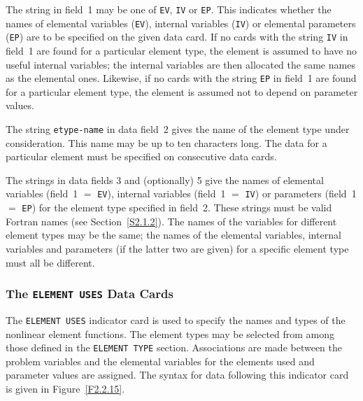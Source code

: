 \documentclass[a4paper]{article}
\begin{document}
The string in field~1  may be  one of {\tt  EV}, {\tt IV} or {\tt EP}.
This indicates whether the  names of  elemental variables
({\tt EV}), internal variables
({\tt IV})  or elemental parameters
({\tt EP}) are to be specified on the given data card.
If no  cards with the string
{\tt  IV}  in field~1   are found for  a particular  element type, the
element is assumed to have no useful internal  variables;
the internal
variables are then  allocated the  same names
as the elemental
ones.  Likewise, if no cards
with the  string  {\tt EP} in  field~1 are found
for a particular element type,
the element is assumed not to depend on parameter values.

The string  {\tt etype-name} in  data field~2 gives  the  name of the
element  type
under   consideration.  This name    may be   up to ten
characters long.  The data for a particular element must  be specified
on consecutive data cards.

The strings in data  fields 3 and  (optionally)  5  give the  names of
elemental  variables
(field~1  $=$   {\tt   EV}),
internal  variables
(field~1 $=$ {\tt  IV})
or parameters
(field~1  $=$ {\tt EP})
for  the element  type
specified in  field~2.   These strings must  be
valid  Fortran  names (see  Section~\ref{S2.1.2}).  The  names  of the
variables for  different element types  may be the  same; the names of
the elemental variables, internal   variables and  parameters
(if the latter two are given) for a specific element  type must all be
different.

\subsubsection{\label{S2.2.15}The {\tt ELEMENT USES} Data Cards}

The {\tt ELEMENT USES}
indicator card
is used to specify the names and types of the nonlinear
element functions.
The element types may be selected from among those
defined in the {\tt ELEMENT TYPE}
section.
Associations are made between the problem variables
and the elemental variables
for  the  elements used and  parameter
values are assigned.
The syntax  for data  following   this indicator   card
is given   in Figure~\ref{F2.2.15}.
\end{document}
